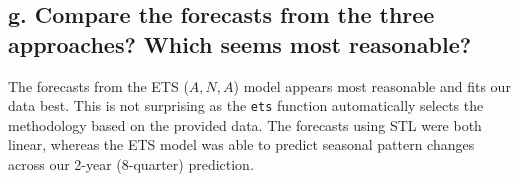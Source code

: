 \documentclass[openany]{book}
\newenvironment{Shaded}{\begin{snugshade}}{\end{snugshade}}
\newcommand{\DataTypeTok}[1]{\textcolor[rgb]{0.13,0.29,0.53}{#1}}
\newcommand{\DecValTok}[1]{\textcolor[rgb]{0.00,0.00,0.81}{#1}}
\newcommand{\FloatTok}[1]{\textcolor[rgb]{0.00,0.00,0.81}{#1}}
\newcommand{\KeywordTok}[1]{\textcolor[rgb]{0.13,0.29,0.53}{\textbf{#1}}}
\newcommand{\NormalTok}[1]{#1}
\newcommand{\OperatorTok}[1]{\textcolor[rgb]{0.81,0.36,0.00}{\textbf{#1}}}
\newcommand{\StringTok}[1]{\textcolor[rgb]{0.31,0.60,0.02}{#1}}
\begin{document}
\hypertarget{g.-compare-the-forecasts-from-the-three-approaches-which-seems-most-reasonable}{%
\subsection{g. Compare the forecasts from the three approaches? Which seems most reasonable?}\label{g.-compare-the-forecasts-from-the-three-approaches-which-seems-most-reasonable}}

The forecasts from the ETS (\(A, N, A\)) model appears most reasonable and fits our data best. This is not surprising as the \texttt{ets} function automatically selects the methodology based on the provided data. The forecasts using STL were both linear, whereas the ETS model was able to predict seasonal pattern changes across our 2-year (8-quarter) prediction.

\begin{Shaded}
\end{Shaded}
\end{document}

